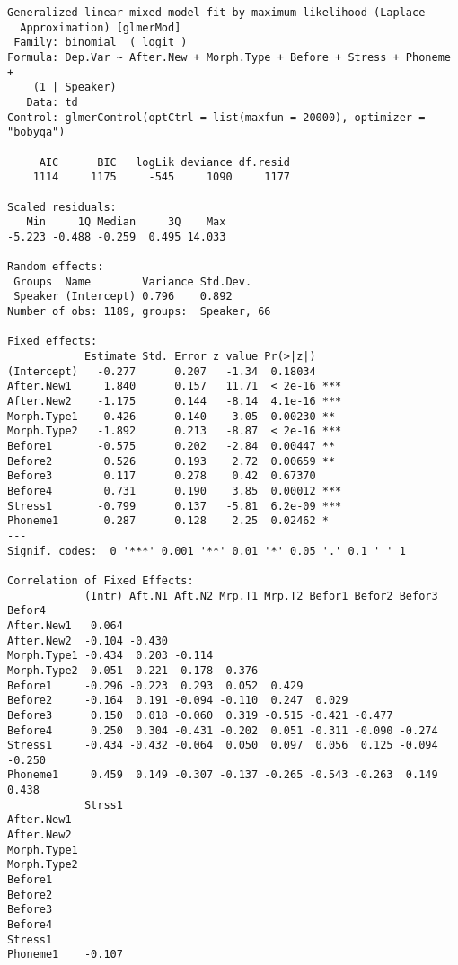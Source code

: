\documentclass[
  10pt,
  letterpaper]{article}
\begin{document}
\begin{verbatim}
Generalized linear mixed model fit by maximum likelihood (Laplace
  Approximation) [glmerMod]
 Family: binomial  ( logit )
Formula: Dep.Var ~ After.New + Morph.Type + Before + Stress + Phoneme +  
    (1 | Speaker)
   Data: td
Control: glmerControl(optCtrl = list(maxfun = 20000), optimizer = "bobyqa")

     AIC      BIC   logLik deviance df.resid 
    1114     1175     -545     1090     1177 

Scaled residuals: 
   Min     1Q Median     3Q    Max 
-5.223 -0.488 -0.259  0.495 14.033 

Random effects:
 Groups  Name        Variance Std.Dev.
 Speaker (Intercept) 0.796    0.892   
Number of obs: 1189, groups:  Speaker, 66

Fixed effects:
            Estimate Std. Error z value Pr(>|z|)    
(Intercept)   -0.277      0.207   -1.34  0.18034    
After.New1     1.840      0.157   11.71  < 2e-16 ***
After.New2    -1.175      0.144   -8.14  4.1e-16 ***
Morph.Type1    0.426      0.140    3.05  0.00230 ** 
Morph.Type2   -1.892      0.213   -8.87  < 2e-16 ***
Before1       -0.575      0.202   -2.84  0.00447 ** 
Before2        0.526      0.193    2.72  0.00659 ** 
Before3        0.117      0.278    0.42  0.67370    
Before4        0.731      0.190    3.85  0.00012 ***
Stress1       -0.799      0.137   -5.81  6.2e-09 ***
Phoneme1       0.287      0.128    2.25  0.02462 *  
---
Signif. codes:  0 '***' 0.001 '**' 0.01 '*' 0.05 '.' 0.1 ' ' 1

Correlation of Fixed Effects:
            (Intr) Aft.N1 Aft.N2 Mrp.T1 Mrp.T2 Befor1 Befor2 Befor3 Befor4
After.New1   0.064                                                        
After.New2  -0.104 -0.430                                                 
Morph.Type1 -0.434  0.203 -0.114                                          
Morph.Type2 -0.051 -0.221  0.178 -0.376                                   
Before1     -0.296 -0.223  0.293  0.052  0.429                            
Before2     -0.164  0.191 -0.094 -0.110  0.247  0.029                     
Before3      0.150  0.018 -0.060  0.319 -0.515 -0.421 -0.477              
Before4      0.250  0.304 -0.431 -0.202  0.051 -0.311 -0.090 -0.274       
Stress1     -0.434 -0.432 -0.064  0.050  0.097  0.056  0.125 -0.094 -0.250
Phoneme1     0.459  0.149 -0.307 -0.137 -0.265 -0.543 -0.263  0.149  0.438
            Strss1
After.New1        
After.New2        
Morph.Type1       
Morph.Type2       
Before1           
Before2           
Before3           
Before4           
Stress1           
Phoneme1    -0.107
\end{verbatim}
\end{document}
